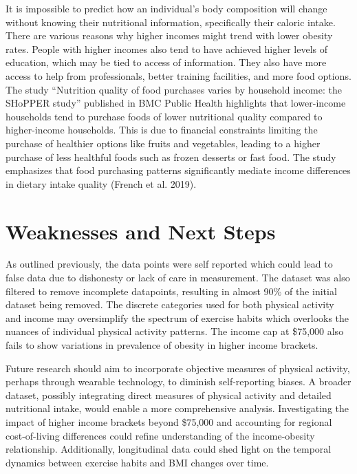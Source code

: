 \documentclass[
  letterpaper,
  DIV=11,
  numbers=noendperiod]{scrartcl}
\begin{document}
It is impossible to predict how an individual's body composition will
change without knowing their nutritional information, specifically their
caloric intake. There are various reasons why higher incomes might trend
with lower obesity rates. People with higher incomes also tend to have
achieved higher levels of education, which may be tied to access of
information. They also have more access to help from professionals,
better training facilities, and more food options. The study ``Nutrition
quality of food purchases varies by household income: the SHoPPER
study'' published in BMC Public Health highlights that lower-income
households tend to purchase foods of lower nutritional quality compared
to higher-income households. This is due to financial constraints
limiting the purchase of healthier options like fruits and vegetables,
leading to a higher purchase of less healthful foods such as frozen
desserts or fast food. The study emphasizes that food purchasing
patterns significantly mediate income differences in dietary intake
quality (French et al. 2019).

\hypertarget{weaknesses-and-next-steps}{%
\section{Weaknesses and Next Steps}\label{weaknesses-and-next-steps}}

As outlined previously, the data points were self reported which could
lead to false data due to dishonesty or lack of care in measurement. The
dataset was also filtered to remove incomplete datapoints, resulting in
almost 90\% of the initial dataset being removed. The discrete
categories used for both physical activity and income may oversimplify
the spectrum of exercise habits which overlooks the nuances of
individual physical activity patterns. The income cap at \$75,000 also
fails to show variations in prevalence of obesity in higher income
brackets.

Future research should aim to incorporate objective measures of physical
activity, perhaps through wearable technology, to diminish
self-reporting biases. A broader dataset, possibly integrating direct
measures of physical activity and detailed nutritional intake, would
enable a more comprehensive analysis. Investigating the impact of higher
income brackets beyond \$75,000 and accounting for regional
cost-of-living differences could refine understanding of the
income-obesity relationship. Additionally, longitudinal data could shed
light on the temporal dynamics between exercise habits and BMI changes
over time.
\end{document}
